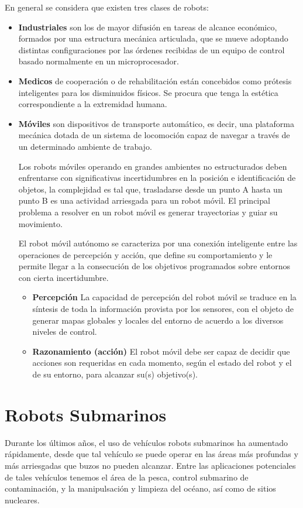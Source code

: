 En general se considera que existen tres clases de robots:
\begin{itemize}
\item \textbf{Industriales} son los de mayor difusión en tareas de alcance económico, formados por una estructura mecánica articulada, que se mueve adoptando distintas configuraciones por las órdenes recibidas de un equipo de control basado normalmente en un microprocesador.
\item \textbf{Medicos}  de cooperación o de rehabilitación están concebidos como prótesis inteligentes para los disminuidos físicos. Se procura que tenga la estética correspondiente a la extremidad humana.
\item \textbf{Móviles} son dispositivos de transporte automático, es decir, una plataforma mecánica dotada de un sistema de locomoción capaz de navegar a través de un determinado ambiente de trabajo.

Los robots móviles operando en grandes ambientes no estructurados deben enfrentarse con significativas incertidumbres en la posición e identificación de objetos, la complejidad es tal que, trasladarse desde un punto A hasta un punto B es una actividad arriesgada para un robot móvil.
El principal problema a resolver en un robot móvil es generar trayectorias y guiar su movimiento.

El robot móvil autónomo se caracteriza por una conexión inteligente entre las operaciones de percepción y acción, que define su comportamiento y le permite llegar a la consecución de los objetivos programados sobre entornos con cierta incertidumbre.
  \begin{itemize}
  \item \textbf{Percepción} La capacidad de percepción del robot móvil se traduce en la síntesis de toda la información provista por los sensores, con el objeto de generar mapas globales y locales del entorno de acuerdo a los diversos niveles de control. 
  \item \textbf{Razonamiento (acción)}  El robot móvil debe ser capaz de decidir que acciones son requeridas en cada momento, según el estado del robot y el de su entorno, para alcanzar su(s) objetivo(s).
  \end{itemize}
\end{itemize}


\section{Robots Submarinos}
\label{cap:Robots Submarinos}
Durante los últimos años, el uso de vehículos robots submarinos ha aumentado rápidamente, desde que tal vehículo se puede operar en las áreas más profundas y más arriesgadas que buzos no pueden alcanzar. Entre las aplicaciones potenciales de tales vehículos tenemos el área de la pesca, control submarino de contaminación, y la manipulsación y limpieza del océano, así como de sitios nucleares.


